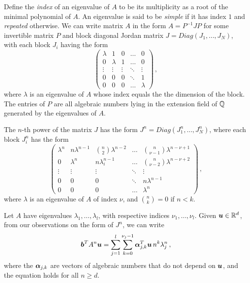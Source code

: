 Define the \emph{index} of an eigenvalue of $A$ to be its multiplicity
as a root of the minimal polynomial of $A$. An eigenvalue is said to be \textit{simple} if it has index $1$ and \textit{repeated} otherwise. We can write matrix $A$
in the form $A=P^{-1}JP$ for some invertible matrix $P$ and block
diagonal Jordan matrix $J=\mathit{Diag}(J_1,\ldots,J_N)$, with each
block $J_i$ having the form
\[\begin{pmatrix} \lambda & 1 & 0 & \ldots & 0\\
                     0 & \lambda & 1& \ldots & 0\\
                    \vdots & \vdots & \vdots & \ddots & \vdots\\
                   0 & 0 & 0 & \ddots & 1\\
                   0 & 0 & 0 & \ldots & \lambda
\end{pmatrix} \, ,\]
where $\lambda$ is an eigenvalue of $A$ whose index equals the the dimension of the block.
  The entries of $P$
are all algebraic numbers lying in the
extension field of $\mathbb{Q}$ generated by the eigenvalues of $A$.

The $n$-th power of the matrix $J$ has the form
$J^n=\mathit{Diag}(J^n_1,\ldots,J^n_N)$, where each block $J_i^n$ has the form
\[\begin{pmatrix}
\lambda^n & n\lambda^{n-1} & \binom{n}{2}\lambda^{n-2}
& \ldots & \binom{n}{\nu-1}\lambda^{n-\nu+1}\\

0 & \lambda^n & n\lambda_i^{n-1} & \ldots &
\binom{n}{\nu-2}\lambda^{n-\nu+2}\\

\vdots & \vdots & \vdots & \ddots & \vdots\\
                   0 & 0 & 0 & \ddots & n\lambda^{n-1}\\
                   0 & 0 & 0 & \ldots & \lambda^n
                 \end{pmatrix} \, ,\] where $\lambda$ is an eigenvalue of $A$ of index $\nu$, and $\binom{n}{k}=0$ if $n<k$.


                 Let $A$ have eigenvalues $\lambda_1,\ldots,\lambda_l$,
                 with respective indices $\nu_1,\ldots,\nu_l$.
Given $\boldsymbol{u}\in\mathbb{R}^d$, from
                 our observations on the form of $J^n$, we can write
\begin{gather}
\myvector{b}^TA^n\myvector{u} =
\sum_{j=1}^l \sum_{k=0}^{\nu_j-1}
\myvector{\alpha}_{j,k}^T\myvector{u}\, n^k\lambda_j^n \, ,
\label{eq:master}
\end{gather}
where the $\boldsymbol{\alpha}_{j,k}$ are vectors of algebraic numbers
that do not depend on $\boldsymbol{u}$, and the equation holds for all
$n\geq d$.

